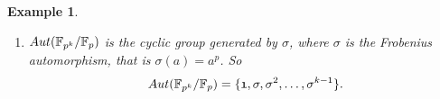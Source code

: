 \documentclass[12pt]{article}
\theoremstyle{plain}
\newtheorem{example}{Example}
\theoremstyle{definition}
\theoremstyle{remark}
\begin{document}
\begin{example}
\begin{enumerate}
So $Aut(\Q(\sqrt{2}, \sqrt{3})/\Q) = \{\mathfrak{1}, \sigma, \tau, \rho\}$. However, we can say something more. We see that $$\sigma^2=\tau^2=\rho^2=\mathfrak{1}$$
and it is not hard to see that $\rho = \sigma\tau = \tau\sigma$. So, in this case we see that $Aut(\Q(\sqrt{2},\sqrt{3})/\Q)$ is an Abelian group that is generated by two elements or that 
$$Aut(\Q(\sqrt{2}, \sqrt{3})/\Q) = \{\mathfrak{1}, \sigma, \tau, \sigma\tau\}.$$ This is the smallest non-cyclic group and is also called the ``Klein-$4$ group". 

\item $Aut(\mathbb{F}_{p^k}/\mathbb{F}_p)$ is the cyclic group generated by $\sigma$, where $\sigma $ is the Frobenius automorphism, that is $\sigma(a)=a^p$. So 
$$Aut(\mathbb{F}_{p^k}/\mathbb{F}_p) = \{\mathfrak{1}, \sigma, \sigma^2, \dots, \sigma^{k-1}\}.$$
\end{enumerate}
\end{example}
\end{document}
